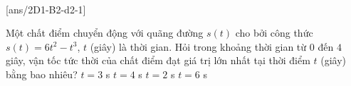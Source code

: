 \\
\setcounter{ex}{0}
[ans/2D1-B2-d2-1]
\begin{ex}%
	Một chất điểm chuyển động với quãng đường $s(t)$ cho bởi công thức $s(t)=6t^2-t^3$, $t$ (giây) là thời gian. Hỏi trong khoảng thời gian từ $0$ đến $4$ giây, vận tốc tức thời của chất điểm đạt giá trị lớn nhất tại thời điểm  $t$ (giây) bằng bao nhiêu?
	\choice
	{$t=3$ s}
	{$t=4$ s}
	{\True $t=2$ s}
	{$t=6$ s}
\end{ex} 

